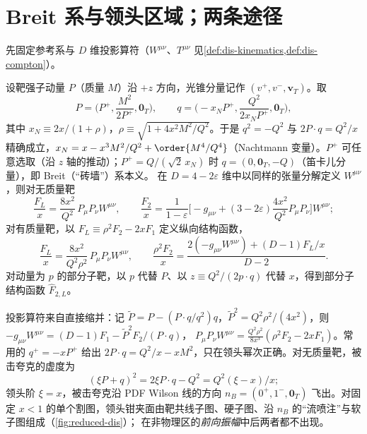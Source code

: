 \section{Breit 系与领头区域；两条途径}\label{sec:disall-regions}

先固定参考系与 $D$ 维投影算符（$W^{\mu\nu}$、$T^{\mu\nu}$ 见\cref{def:dis-kinematics,def:dis-compton}）。

\begin{definition}\label{def:disall-breit}
设靶强子动量 $P$（质量 $M$）沿 $+z$ 方向，光锥分量记作 $(v^+,v^-,\mathbf v_T)$。取
\begin{equation}\label{eq:disall-breit}
P=\Big(P^+,\frac{M^2}{2P^+},\mathbf 0_T\Big),\qquad q=\Big(-x_NP^+,\frac{Q^2}{2x_NP^+},\mathbf 0_T\Big),
\end{equation}
其中 $x_N\equiv2x/(1+\rho)$，$\rho\equiv\sqrt{1+4x^2M^2/Q^2}$。于是 $q^2=-Q^2$ 与 $2P\cdot q=Q^2/x$ 精确成立，$x_N=x-x^3M^2/Q^2+\order{M^4/Q^4}$（Nachtmann 变量）。$P^+$ 可任意选取（沿 $z$ 轴的推动）；$P^+=Q/(\sqrt2\,x_N)$ 时 $q=(0,\mathbf 0_T,-Q)$（笛卡儿分量），即 Breit（“砖墙”）系本义。
在 $D=4-2\varepsilon$ 维中以同样的张量分解定义 $W^{\mu\nu}$，则对无质量靶
\begin{equation}\label{eq:disall-proj}
\frac{F_L}{x}=\frac{8x^2}{Q^2}\,P_\mu P_\nu W^{\mu\nu},\qquad
\frac{F_2}{x}=\frac1{1-\varepsilon}\Big[-g_{\mu\nu}+(3-2\varepsilon)\frac{4x^2}{Q^2}P_\mu P_\nu\Big]W^{\mu\nu};   %
\end{equation}
对有质量靶，以 $F_L\equiv\rho^2F_2-2xF_1$ 定义纵向结构函数，
\begin{equation}\label{eq:disall-proj-massive}
\frac{F_L}{x}=\frac{8x^2}{Q^2\rho^2}\,P_\mu P_\nu W^{\mu\nu},\qquad
\frac{\rho^2F_2}{x}=\frac{2(-g_{\mu\nu}W^{\mu\nu})+(D-1)F_L/x}{D-2}.   %
\end{equation}
对动量为 $p$ 的部分子靶，以 $p$ 代替 $P$、以 $z\equiv Q^2/(2p\cdot q)$ 代替 $x$，得到部分子结构函数 $\hat F_{2,L}$。
\end{definition}

\noindent
投影算符来自直接缩并：记 $\tilde P=P-(P\cdot q/q^2)q$，$\tilde P^2=Q^2\rho^2/(4x^2)$，则 $-g_{\mu\nu}W^{\mu\nu}=(D-1)F_1-\tilde P^2F_2/(P\cdot q)$，
$P_\mu P_\nu W^{\mu\nu}=\frac{Q^2\rho^2}{8x^3}(\rho^2F_2-2xF_1)$。常用的 $q^+=-xP^+$ 给出 $2P\cdot q=Q^2/x-xM^2$，只在领头幂次正确。对无质量靶，被击夸克的虚度为
\begin{equation}\label{eq:disall-current-virtuality}
(\xi P+q)^2=2\xi P\cdot q-Q^2=Q^2(\xi-x)/x;
\end{equation}
领头阶 $\xi=x$，被击夸克沿 PDF Wilson 线的方向 $n_B=(0^+,1^-,\mathbf 0_T)$ 飞出。对固定 $x<1$ 的单个割图，领头钳夹面由靶共线子图、硬子图、沿 $n_B$ 的“流喷注”与软子图组成（\cref{fig:reduced-dis}）；
在非物理区的\emph{前向振幅}中后两者都不出现。


